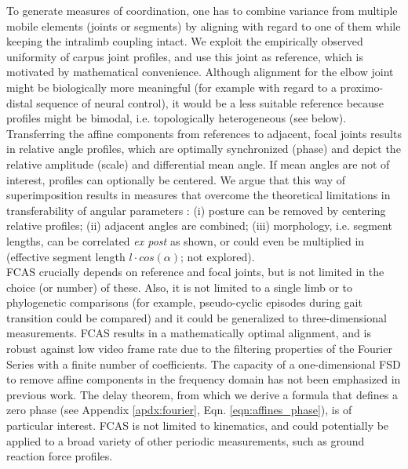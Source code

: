 \documentclass[10pt, a4paper]{article}
\begin{document}
\begin{linenumbers}[1]
To generate measures of coordination, one has to combine variance from multiple mobile elements (joints or segments) by aligning with regard to one of them while keeping the intralimb coupling intact. 
We exploit the empirically observed uniformity of carpus joint profiles, and use this joint as reference, which is motivated by mathematical convenience. 
Although alignment for the elbow joint might be biologically more meaningful (for example with regard to a proximo-distal sequence of neural control), it would be a less suitable reference because profiles might be bimodal, i.e. topologically heterogeneous (see below). 
Transferring the affine components from references to adjacent, focal joints results in relative angle profiles, which are optimally synchronized (phase) and depict the relative amplitude (scale) and differential mean angle. 
If mean angles are not of interest, profiles can optionally be centered. 
We argue that this way of superimposition results in measures that overcome the theoretical limitations in transferability of angular parameters \citep{Gatesy2011}: (i) posture can be removed by centering relative profiles; (ii) adjacent angles are combined; (iii) morphology, i.e. segment lengths, can be correlated \textit{ex post} as shown, or could even be multiplied in (effective segment length $l\cdot cos\left(\alpha\right)$; not explored). 
\\FCAS crucially depends on reference and focal joints, but is not limited in the choice (or number) of these. 
Also, it is not limited to a single limb or to phylogenetic comparisons (for example, pseudo-cyclic episodes during gait transition could be compared) and it could be generalized to three-dimensional measurements. 
FCAS results in a mathematically optimal alignment, and is robust against low video frame rate due to the filtering properties of the Fourier Series with a finite number of coefficients. 
The capacity of a one-dimensional FSD to remove affine components in the frequency domain has not been emphasized in previous work. 
The delay theorem, from which we derive a formula that defines a zero phase (see Appendix \ref{apdx:fourier}, Eqn. \ref{eqn:affines_phase}), is of particular interest.  
FCAS is not limited to kinematics, and could potentially be applied to a broad variety of other periodic measurements, such as ground reaction force profiles. 



\end{linenumbers}
\end{document}
